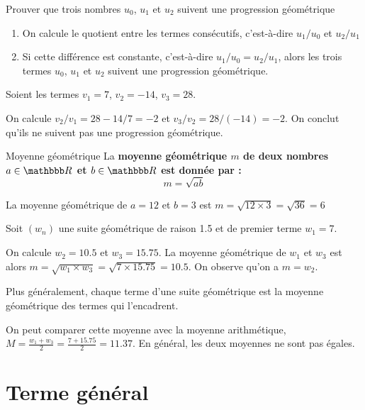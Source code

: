 \documentclass[10pt,a4paper,openany,twoside]{book}
\begin{document}
\begin{methode}{Prouver que trois nombres $u_0$, $u_1$ et $u_2$ suivent une progression géométrique}{}
\begin{enumerate}
	\item On calcule le quotient entre les termes consécutifs, c'est-à-dire $u_1/u_0$ et $u_2/u_1$
	\item
	Si cette différence est constante, c'est-à-dire $u_1/u_0 = u_2/u_1$, alors les trois termes $u_0$, $u_1$ et $u_2$ suivent une progression géométrique.
\end{enumerate}
\end{methode}

\begin{ex}{}{}
Soient les termes $v_1=7$, $v_2=-14$, $v_3=28$.

On calcule $v_2/v_1=28-14/7=-2$ et $v_3/v_2=28/(-14) =-2$. On conclut qu'ils ne suivent pas une progression géométrique.
\end{ex}

\begin{defi}{Moyenne géométrique}{}
	La \bf{moyenne géométrique} $m$ de deux nombres $a\in\R$ et $b\in\R$ est donnée par :
	$$m = \sqrt{ab}$$
\end{defi}

\begin{ex}{}{}
  La moyenne géométrique de $a=12$ et $b=3$ est $m=\sqrt{12\times 3 }=\sqrt{36}=6$
\end{ex}

\begin{ex}{}{}
	Soit $(w_n)$ une suite géométrique de raison 1.5 et de premier terme $w_1=7$.
	
	On calcule $w_2=10.5$ et $w_3=15.75$. La moyenne géométrique de $w_1$ et $w_3$ est alors $m=\sqrt{w_1 \times w_3} = \sqrt{7\times15.75}=10.5$. On observe qu'on a $m = w_2$.
\end{ex}

\begin{rem}{}{}
  Plus généralement, chaque terme d'une suite géométrique est la moyenne géométrique des termes qui l'encadrent.
\end{rem}

\begin{ex}{}{}
		On peut comparer cette moyenne avec la moyenne arithmétique, $M = \frac{w_1+w_3}{2} = \frac{7+15.75}{2} = 11.37$. En général, les deux moyennes ne sont pas égales.
\end{ex}

\section{Terme général}
\end{document}
